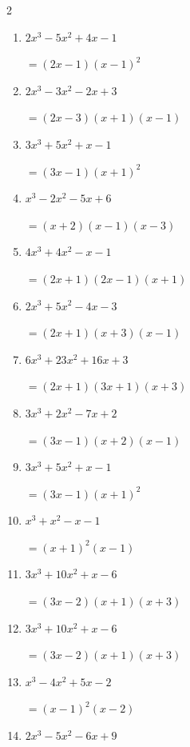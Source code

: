 \begin{multicols}{2}
\begin{enumerate}
  \item $2x^{3}-5x^{2}+4x-1$

        $=(2x-1)(x-1) ^{ 2 }$

  \item $2x^{3}-3x^{2}-2x+3$

        $=(2x-3)(x+1)(x-1)$

\columnbreak %

  \item $3x^{3}+5x^{2}+x-1$

        $=(3x-1)(x+1) ^{ 2 }$

  \item $x^{3}-2x^{2}-5x+6$

        $=(x+2)(x-1)(x-3)$

  \item $4x^{3}+4x^{2}-x-1$

        $=(2x+1)(2x-1)(x+1)$

  \item $2x^{3}+5x^{2}-4x-3$

        $=(2x+1)(x+3)(x-1)$

  \item $6x^{3}+23x^{2}+16x+3$

        $=(2x+1)(3x+1)(x+3)$

\columnbreak %

\resetques

  \item $3x^{3}+2x^{2}-7x+2$

        $=(3x-1)(x+2)(x-1)$

  \item $3x^{3}+5x^{2}+x-1$

        $=(3x-1)(x+1) ^{ 2 }$

  \item $x^{3}+x^{2}-x-1$

        $=(x+1) ^{ 2 }(x-1)$

  \item $3x^{3}+10x^{2}+x-6$

        $=(3x-2)(x+1)(x+3)$

  \item $3x^{3}+10x^{2}+x-6$

        $=(3x-2)(x+1)(x+3)$

\columnbreak %

  \item $x^{3}-4x^{2}+5x-2$

        $=(x-1) ^{ 2 }(x-2)$

  \item $2x^{3}-5x^{2}-6x+9$


\end{enumerate}
\end{multicols}
